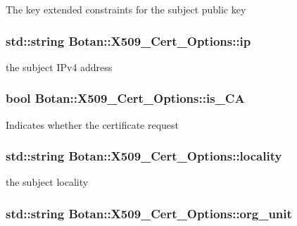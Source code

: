 The key extended constraints for the subject public key \hypertarget{classBotan_1_1X509__Cert__Options_a98bed02e619008fc99fa9080b6fede77}{
\subsubsection[{ip}]{\setlength{\rightskip}{0pt plus 5cm}std\-::string Botan\-::\-X509\-\_\-\-Cert\-\_\-\-Options\-::ip}}\label{classBotan_1_1X509__Cert__Options_a98bed02e619008fc99fa9080b6fede77}
the subject I\-Pv4 address \hypertarget{classBotan_1_1X509__Cert__Options_a4e29a75b6febfd81edb68a46e72432fb}{
\subsubsection[{is\-\_\-\-C\-A}]{\setlength{\rightskip}{0pt plus 5cm}bool Botan\-::\-X509\-\_\-\-Cert\-\_\-\-Options\-::is\-\_\-\-C\-A}}\label{classBotan_1_1X509__Cert__Options_a4e29a75b6febfd81edb68a46e72432fb}
Indicates whether the certificate request \hypertarget{classBotan_1_1X509__Cert__Options_a8c7201a56c28890d2e57b084cb6a20d3}{
\subsubsection[{locality}]{\setlength{\rightskip}{0pt plus 5cm}std\-::string Botan\-::\-X509\-\_\-\-Cert\-\_\-\-Options\-::locality}}\label{classBotan_1_1X509__Cert__Options_a8c7201a56c28890d2e57b084cb6a20d3}
the subject locality \hypertarget{classBotan_1_1X509__Cert__Options_a0cf6a8c6cb64d8ee6e42e7c6b887d19f}{
\subsubsection[{org\-\_\-unit}]{\setlength{\rightskip}{0pt plus 5cm}std\-::string Botan\-::\-X509\-\_\-\-Cert\-\_\-\-Options\-::org\-\_\-unit}}\label{classBotan_1_1X509__Cert__Options_a0cf6a8c6cb64d8ee6e42e7c6b887d19f}
